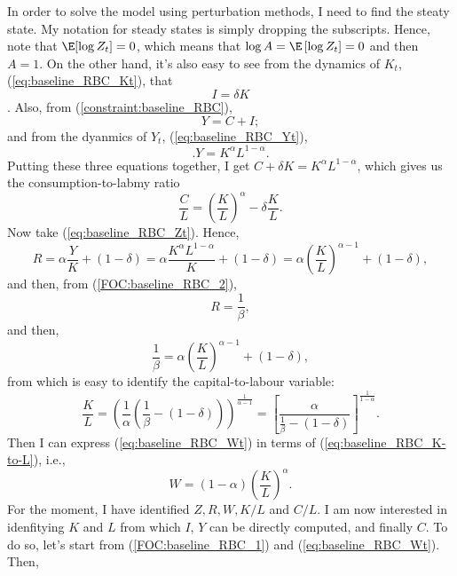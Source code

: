 In order to solve the model using perturbation methods, I need to find the steaty state. My notation for steady states is simply dropping the subscripts. Hence, note that $\E[\log Z_t] = 0$, which means that $\log A = \E\left[\log Z_t\right] = 0$ and then $A=1$. On the other hand, it's also easy to see from the dynamics of $K_t$, (\ref{eq:baseline_RBC_Kt}), that
\begin{equation}\label{eq:baseline_RBC_ss_I_to_K}
	I = \delta K
\end{equation}.
Also, from (\ref{constraint:baseline_RBC}),
\begin{equation}\label{eq:baseline_RBC_ss_C_Y_I}
	Y = C + I;
\end{equation}
and from the dyanmics of $Y_t$, (\ref{eq:baseline_RBC_Yt}),
\begin{equation}\label{eq:baseline_RBC_ss_Y_K_L}.
	Y = K^\alpha L^{1-\alpha}.
\end{equation}
Putting these three equations together, I get $C + \delta K= K^\alpha L^{1-\alpha}$, which gives us the consumption-to-labmy ratio
\begin{equation}
	\frac{C}{L} = \left(\frac{K}{L}\right)^\alpha - \delta \frac{K}{L}.
\end{equation}
Now take (\ref{eq:baseline_RBC_Zt}). Hence,
\begin{equation}
	R = \alpha \frac{Y}{K} + (1-\delta)= \alpha\frac{K^\alpha L^{1-\alpha}}{K} + (1-\delta) = \alpha \left(\frac{K}{L}\right)^{\alpha-1} + (1-\delta),
\end{equation}
and then, from (\ref{FOC:baseline_RBC_2}),
\begin{equation}
	R = \frac{1}{\beta},
\end{equation}
and then,
\begin{equation}
	\frac{1}{\beta} = \alpha \left(\frac{K}{L}\right)^{\alpha-1} + (1-\delta),
\end{equation}
from which is easy to identify the capital-to-labour variable:
\begin{equation}\label{eq:baseline_RBC_K-to-L}
	\frac{K}{L} = \left(\frac{1}{\alpha} \left(\frac{1}{\beta}-(1-\delta)\right)\right)^{\frac{1}{\alpha-1}} = \left[\frac{\alpha}{\frac{1}{\beta}-(1-\delta)}\right]^{\frac{1}{1-\alpha}}.
\end{equation}
Then I can express (\ref{eq:baseline_RBC_Wt}) in terms of (\ref{eq:baseline_RBC_K-to-L}), i.e.,
\begin{equation}
	W = (1-\alpha)\left(\frac{K}{L}\right)^\alpha.
\end{equation}
For the moment, I have identified $Z, R, W, K/L$ and $C/L$. I am now interested in idenfitying $K$ and $L$ from which $I$, $Y$ can be directly computed, and finally $C$. To do so, let's start from (\ref{FOC:baseline_RBC_1}) and (\ref{eq:baseline_RBC_Wt}). Then,
